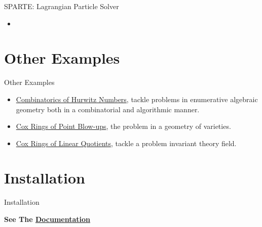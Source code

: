 \documentclass[aspectratio=169,xcolor=dvipsnames]{beamer}
\begin{document}

\begin{frame}{SPARTE: Lagrangian Particle Solver}
   \begin{itemize}
       \item 
   \end{itemize}
\end{frame}






\section{Other Examples}


\begin{frame}{Other Examples}
    \begin{itemize}
        \item \textcolor{brown}{\href{https://github.com/micjoswig/oscar-notebooks/blob/master/SIAM-News/Hurwitz_Combinatorics.ipynb}{Combinatorics of Hurwitz Numbers}}, tackle problems in enumerative algebraic geometry both in a combinatorial and algorithmic manner.
        \item \textcolor{brown}{\href{https://github.com/micjoswig/oscar-notebooks/blob/master/SIAM-News/Cox_rings_of_blow_ups_of_points.ipynb}{Cox Rings of Point Blow-ups}}, the problem in a geometry of varieties.
        \item \textcolor{brown}{\href{https://github.com/micjoswig/oscar-notebooks/blob/master/SIAM-News/Cox_rings_of_linear_quotients.ipynb}{Cox Rings of Linear Quotients}}, tackle a problem invariant theory field. 
        
    \end{itemize}
\end{frame}


\section{Installation}

\begin{frame}{Installation}
    \Huge{\centerline{\textbf{See The \href{https://www.oscar-system.org/}{Documentation}}}}
\end{frame}


\end{document}
